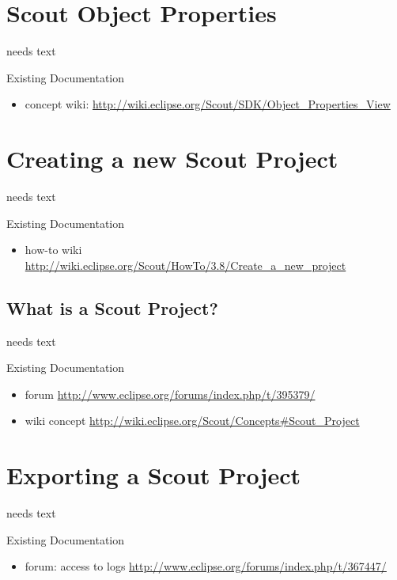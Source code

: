 \documentclass[a4paper,10pt,twoside]{book}
\begin{document}
\section{Scout Object Properties}
needs text

\noindent Existing Documentation
\begin{itemize}
  \item concept wiki: \url{http://wiki.eclipse.org/Scout/SDK/Object_Properties_View}
\end{itemize}

\section{Creating a new Scout Project}
needs text

\noindent Existing Documentation
\begin{itemize}
  \item how-to wiki \url{http://wiki.eclipse.org/Scout/HowTo/3.8/Create_a_new_project}
\end{itemize}

\subsection{What is a Scout Project?}
needs text

\noindent Existing Documentation
\begin{itemize}
  \item forum \url{http://www.eclipse.org/forums/index.php/t/395379/}
  \item wiki concept \url{http://wiki.eclipse.org/Scout/Concepts#Scout_Project}
\end{itemize}

\section{Exporting a Scout Project}
needs text

\noindent Existing Documentation
\begin{itemize}
  \item forum: access to logs \url{http://www.eclipse.org/forums/index.php/t/367447/}
\end{itemize}

\end{document}
